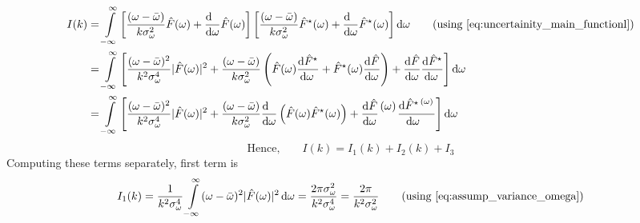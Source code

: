 \documentclass[11pt, a4paper]{article}
\newcommand{\numerator}[1]{\genfrac{}{}{0pt}{}{#1}{}}
\newcommand{\variance}[1]{\sigma_{#1}^{2}}
\newcommand{\stdev}[1]{\sigma_{#1}}
\newcommand{\diff}{\mathop{}\!\mathrm{d}}
\newcommand{\domega}{\diff \omega}
\newcommand{\derv}[1]{\frac{\diff \hfill}{\diff #1}}	%
\newcommand{\dervb}[2]{\derv{#1} \left(#2\right)}  %
\newcommand{\dervf}[2]{\frac{\diff #2}{\diff #1 \hfil}}	%
\newcommand{\dint}[2]{\int \limits_{#1}^{#2}}  %
\newcommand{\intinfty}{\dint{-\infty}{\infty}}	%
\begin{document}
\begin{align*}
	I(k) & = \intinfty \left[\frac{(\omega - \bar{\omega})}{k \variance{\omega}} \hat{F}(\omega) + \derv{\omega}\hat{F}(\omega)\right] \left[\frac{(\omega - \bar{\omega})}{k \variance{\omega}} \hat{F}^{\star}(\omega) + \derv{\omega}\hat{F}^{\star}(\omega)\right] \domega \tag{using \eqref{eq:uncertainity_main_functionl}} \\
	& = \intinfty \left[\frac{(\omega - \bar{\omega})^{2}}{k^{2} \stdev{\omega}^{4}} |\hat{F}(\omega)|^{2} + \frac{(\omega - \bar{\omega})}{k \variance{\omega}}\left(\hat{F}(\omega) \dervf{\omega}{\hat{F}^{\star}} + \hat{F}^{\star}(\omega) \dervf{\omega}{\hat{F}} \right) + \dervf{\omega}{\hat{F}} \dervf{\omega}{\hat{F}^{\star}}
	\right] \domega \\
	& = \intinfty \left[\frac{(\omega - \bar{\omega})^{2}}{k^{2} \stdev{\omega}^{4}} |\hat{F}(\omega)|^{2} + \frac{(\omega - \bar{\omega})}{k \variance{\omega}}\dervb{\omega}{\hat{F}(\omega) \hat{F}^{\star}(\omega)} + \dervf{\omega}{\hat{F}}\numerator{(\omega)} \dervf{\omega}{\hat{F}^{\star}\numerator{(\omega)}}
	\right] \domega
\end{align*}
\begin{equation}\label{eq:uncertainty_integral_triplet}
	\text{Hence,} \qquad I(k) = I_{1}(k) + I_{2}(k) + I_{3}
\end{equation}
Computing these terms separately, first term is
\begin{equation}\label{eq:uncertainty_integral_part1}
	I_{1}(k) = \frac{1}{k^{2} \stdev{\omega}^{4}} \intinfty (\omega - \bar{\omega})^{2} |\hat{F}(\omega)|^{2} \domega = \frac{2 \pi \variance{\omega}}{k^{2} \stdev{\omega}^{4}} = \frac{2\pi}{k^{2} \variance{\omega}} \qquad \text{(using \eqref{eq:assump_variance_omega})}
\end{equation}
\end{document}
